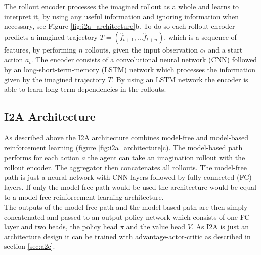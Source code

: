 The rollout encoder processes the imagined rollout as a whole and learns to interpret it, by using any useful information and ignoring information when necessary, see Figure \ref{fig:i2a_architecture}b.
To do so each rollout encoder predicts a imagined trajectory $T = (\hat{f}_{t+1}, ... \hat{f}_{t+n})$, which is a sequence of features, by performing $n$ rollouts, given the input observation $o_t$ and a start action $a_t$.
The encoder consists of a convolutional neural network (CNN) followed by an long-short-term-memory (LSTM) network which processes the information given by the imagined trajectory $T$. By using an LSTM network the encoder is able to learn long-term dependencies in the rollouts.\\

 
   
 
\subsection{I2A Architecture}


As described above the I2A architecture combines model-free and model-based reinforcement learning (figure \ref{fig:i2a_architecture}c).
The model-based path performs for each action $a$ the agent can take an imagination rollout with the rollout encoder.
The aggregator then concatenates all rollouts.
The model-free path is just a neural network with CNN layers followed by fully connected (FC) layers.
If only the model-free path would be used the architecture would be equal to a model-free reinforcement learning architecture.\\
 

The outputs of the model-free path and the model-based path are then simply concatenated and passed to an output policy network which consists of one FC layer and two heads, the policy head $\pi$ and the value head $V$.
As I2A is just an architecture design it can be trained with advantage-actor-critic as described in section \ref{sec:a2c}.\\

